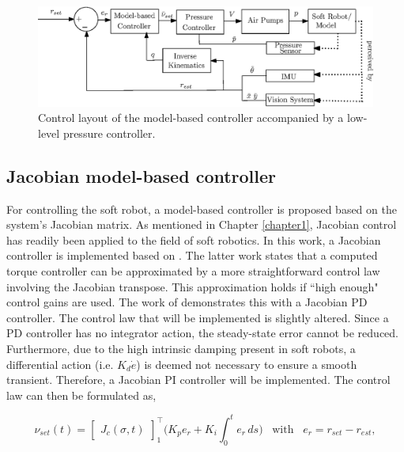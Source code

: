 \begin{figure}[H]
    \centering
    \includegraphics[width = \textwidth]{Figures/Chapter4/ControlschemeActualwithPump.eps}
    \caption{Control layout of the model-based controller accompanied by a low-level pressure controller.}
    \label{fig4:controllayout}
\end{figure}




\subsection{Jacobian model-based controller}


For controlling the soft robot, a model-based controller is proposed based on the system's Jacobian matrix. As mentioned in Chapter \ref{chapter1}, Jacobian control has readily been applied to the field of soft robotics. In this work, a Jacobian controller is implemented based on \cite{MOOSAVIAN20071226}. The latter work states that a computed torque controller can be approximated by a more straightforward control law involving the Jacobian transpose. This approximation holds if ``high enough" control gains are used. The work of \cite{MOOSAVIAN20071226} demonstrates this with a Jacobian PD controller. The control law that will be implemented is slightly altered. Since a PD controller has no integrator action, the steady-state error cannot be reduced. Furthermore, due to the high intrinsic damping present in soft robots, a differential action (i.e. $K_d \dot{e}$) is deemed not necessary to ensure a smooth transient. Therefore, a Jacobian PI controller will be implemented. The control law can then be formulated as,


\begin{equation}
    \nu_{set}(t) = \begin{bmatrix}J_c(\sigma,t)\end{bmatrix}_1^\top \Big(K_p e_r + K_i \int_0^t e_r \hspace{2pt} ds \Big) \hspace{10pt} \text{with} \hspace{10pt} e_r = r_{set}-r_{est}, 
    \label{eq:tau}
\end{equation}

